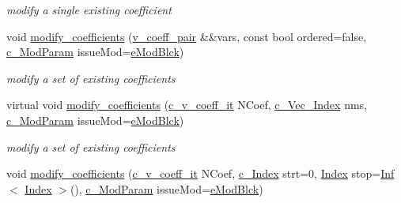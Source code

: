 \begin{Indent}
\begin{DoxyCompactItemize}
\begin{DoxyCompactList}\small\item\em modify a single existing coefficient \end{DoxyCompactList}\item 
void \mbox{\hyperlink{class_s_m_spp__di__unipi__it_1_1_linear_function_a1a7d2a213864f8140442238c988f2511}{modify\+\_\+coefficients}} (\mbox{\hyperlink{class_s_m_spp__di__unipi__it_1_1_linear_function_aee8988faa66c7c9013613e2c76580ddf}{v\+\_\+coeff\+\_\+pair}} \&\&vars, const bool ordered=false, \mbox{\hyperlink{group___modification___t_y_p_e_s_ga544246d8c462e9a2d817c2c30797968f}{c\+\_\+\+Mod\+Param}} issue\+Mod=\mbox{\hyperlink{group___modification___t_y_p_e_s_gga48fddcdd03a03f49b7e389ca1ed938d4a21b14b26b1c0093a0905f6fc010bad29}{e\+Mod\+Blck}})
\begin{DoxyCompactList}\small\item\em modify a set of existing coefficients \end{DoxyCompactList}\item 
virtual void \mbox{\hyperlink{class_s_m_spp__di__unipi__it_1_1_linear_function_a91fb9548bbed19895b04e36e764c70ae}{modify\+\_\+coefficients}} (\mbox{\hyperlink{class_s_m_spp__di__unipi__it_1_1_linear_function_a9e665512d3a7f7aae5031e99c675cc11}{c\+\_\+v\+\_\+coeff\+\_\+it}} N\+Coef, \mbox{\hyperlink{group___thin_var_dep_interface___c_l_a_s_s_e_s_ga03461123d4f6090aefeb97ef653d3f2b}{c\+\_\+\+Vec\+\_\+\+Index}} nms, \mbox{\hyperlink{group___modification___t_y_p_e_s_ga544246d8c462e9a2d817c2c30797968f}{c\+\_\+\+Mod\+Param}} issue\+Mod=\mbox{\hyperlink{group___modification___t_y_p_e_s_gga48fddcdd03a03f49b7e389ca1ed938d4a21b14b26b1c0093a0905f6fc010bad29}{e\+Mod\+Blck}})
\begin{DoxyCompactList}\small\item\em modify a set of existing coefficients \end{DoxyCompactList}\item 
void \mbox{\hyperlink{class_s_m_spp__di__unipi__it_1_1_linear_function_a302cec77ff24f7f32e394eeb84b5569c}{modify\+\_\+coefficients}} (\mbox{\hyperlink{class_s_m_spp__di__unipi__it_1_1_linear_function_a9e665512d3a7f7aae5031e99c675cc11}{c\+\_\+v\+\_\+coeff\+\_\+it}} N\+Coef, \mbox{\hyperlink{group___thin_var_dep_interface___c_l_a_s_s_e_s_gaee6156e2ce80720d57a082d80f39d8cc}{c\+\_\+\+Index}} strt=0, \mbox{\hyperlink{group___thin_var_dep_interface___c_l_a_s_s_e_s_gad53d6229d7ec28555a9c9c2fd9abf773}{Index}} stop=\mbox{\hyperlink{class_s_m_spp__di__unipi__it_1_1_inf}{Inf}}$<$ \mbox{\hyperlink{group___thin_var_dep_interface___c_l_a_s_s_e_s_gad53d6229d7ec28555a9c9c2fd9abf773}{Index}} $>$(), \mbox{\hyperlink{group___modification___t_y_p_e_s_ga544246d8c462e9a2d817c2c30797968f}{c\+\_\+\+Mod\+Param}} issue\+Mod=\mbox{\hyperlink{group___modification___t_y_p_e_s_gga48fddcdd03a03f49b7e389ca1ed938d4a21b14b26b1c0093a0905f6fc010bad29}{e\+Mod\+Blck}})

\end{DoxyCompactItemize}
\end{Indent}
